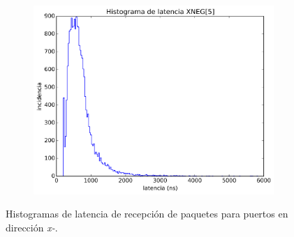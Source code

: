\begin{figure}[ht!]
\begin{center}
\begin{subfigure}[b]{0.4\textwidth}
		    \caption{}
		    \label{fig:histograma_4}
	    \end{subfigure}
	    ~ %
	    \begin{subfigure}[b]{0.4\textwidth}
	    	\includegraphics[width=\textwidth]{figures/ch6_histograma_source_5.png}
		    \caption{}
		    \label{fig:histograma_5}
	    \end{subfigure}
    \end{center}
    \caption{%
        Histogramas de latencia de recepción de paquetes para puertos en dirección \textit{x-}.
     }%
   \label{fig:ch6_histogramas_1}
\end{figure}

